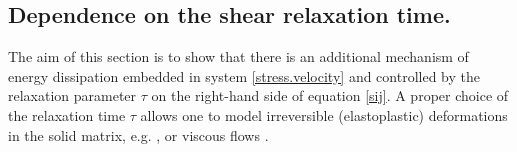 \documentclass[3p,times,table]{article}
\begin{document}

\subsection{Dependence on the shear relaxation time.}


The aim of this section is to show that there is an additional mechanism of 
energy dissipation embedded in system \eqref{stress.velocity} and controlled 
by the relaxation parameter $\tau$ on the right-hand side of equation
\eqref{sij}. A proper choice of the relaxation time $ \tau $ allows one to 
model 
irreversible (elastoplastic) deformations in the solid matrix, e.g. 
\cite{HYP2016,Hyper-Hypo2019}, or viscous flows \cite{DPRZ2016}.
\end{document}

